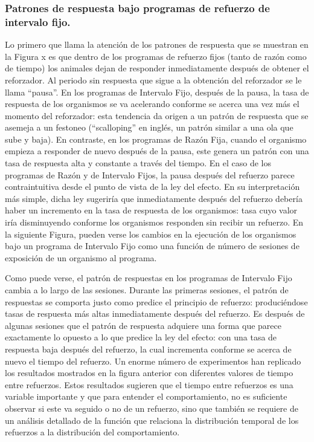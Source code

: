 \documentclass[
  letterpaper,
]{book}
\makeatletter
\newcommand*\pandocbounded[1]{%
  \sbox\pandoc@box{#1}%
  \Gscale@div\@tempa{\textheight}{\dimexpr\ht\pandoc@box+\dp\pandoc@box\relax}%
  \Gscale@div\@tempb{\linewidth}{\wd\pandoc@box}%
  \ifdim\@tempb\p@<\@tempa\p@\let\@tempa\@tempb\fi%
  \ifdim\@tempa\p@<\p@\scalebox{\@tempa}{\usebox\pandoc@box}%
  \else\usebox{\pandoc@box}%
  \fi%
}
\makeatother
\begin{document}
\subsubsection{Patrones de respuesta bajo programas de refuerzo de
intervalo
fijo.}\label{patrones-de-respuesta-bajo-programas-de-refuerzo-de-intervalo-fijo.}

Lo primero que llama la atención de los patrones de respuesta que se
muestran en la Figura x es que dentro de los programas de refuerzo fijos
(tanto de razón como de tiempo) los animales dejan de responder
inmediatamente después de obtener el reforzador. Al periodo sin
respuesta que sigue a la obtención del reforzador se le llama ``pausa''.
En los programas de Intervalo Fijo, después de la pausa, la tasa de
respuesta de los organismos se va acelerando conforme se acerca una vez
más el momento del reforzador: esta tendencia da origen a un patrón de
respuesta que se asemeja a un festoneo (``scalloping'' en inglés, un
patrón similar a una ola que sube y baja). En contraste, en los
programas de Razón Fija, cuando el organismo empieza a responder de
nuevo después de la pausa, este genera un patrón con una tasa de
respuesta alta y constante a través del tiempo. En el caso de los
programas de Razón y de Intervalo Fijos, la pausa después del refuerzo
parece contraintuitiva desde el punto de vista de la ley del efecto. En
su interpretación más simple, dicha ley sugeriría que inmediatamente
después del refuerzo debería haber un incremento en la tasa de respuesta
de los organismos: tasa cuyo valor iría disminuyendo conforme los
organismos responden sin recibir un refuerzo. En la siguiente Figura,
pueden verse los cambios en la ejecución de los organismos bajo un
programa de Intervalo Fijo como una función de número de sesiones de
exposición de un organismo al programa.

\pandocbounded{\texttt{[image: DraggedImage-2.png]}}

Como puede verse, el patrón de respuestas en los programas de Intervalo
Fijo cambia a lo largo de las sesiones. Durante las primeras sesiones,
el patrón de respuestas se comporta justo como predice el principio de
refuerzo: produciéndose tasas de respuesta más altas inmediatamente
después del refuerzo. Es después de algunas sesiones que el patrón de
respuesta adquiere una forma que parece exactamente lo opuesto a lo que
predice la ley del efecto: con una tasa de respuesta baja después del
refuerzo, la cual incrementa conforme se acerca de nuevo el tiempo del
refuerzo. Un enorme número de experimentos han replicado los resultados
mostrados en la figura anterior con diferentes valores de tiempo entre
refuerzos. Estos resultados sugieren que el tiempo entre refuerzos es
una variable importante y que para entender el comportamiento, no es
suficiente observar si este va seguido o no de un refuerzo, sino que
también se requiere de un análisis detallado de la función que relaciona
la distribución temporal de los refuerzos a la distribución del
comportamiento.
\end{document}
